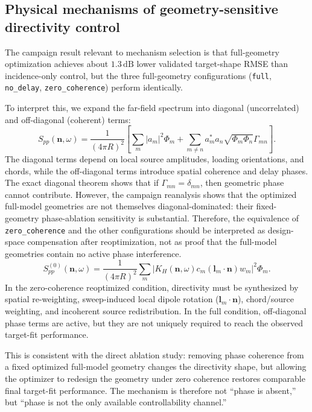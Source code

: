 \documentclass[11pt]{article}
\newcommand{\vect}[1]{\bm{#1}}
\begin{document}
\subsection{Physical mechanisms of geometry-sensitive directivity control}

The campaign result relevant to mechanism selection is that full-geometry optimization achieves about $1.3\,\mathrm{dB}$ lower validated target-shape RMSE than incidence-only control, but the three full-geometry configurations (\texttt{full}, \texttt{no\_delay}, \texttt{zero\_coherence}) perform identically.

To interpret this, we expand the far-field spectrum into diagonal (uncorrelated) and off-diagonal (coherent) terms:
\begin{equation}
    S_{pp}(\vect{n},\omega)
    =
    \frac{1}{(4\pi R)^2}
    \left[
        \sum_m |a_m|^2 \Phi_m
        +
        \sum_{m\neq n}
        a_m^* a_n
        \sqrt{\Phi_m\Phi_n}
        \Gamma_{mn}
    \right].
\end{equation}
The diagonal terms depend on local source amplitudes, loading orientations, and chords, while the off-diagonal terms introduce spatial coherence and delay phases. The exact diagonal theorem shows that if $\Gamma_{mn}=\delta_{mn}$, then geometric phase cannot contribute. However, the campaign reanalysis shows that the optimized full-model geometries are not themselves diagonal-dominated: their fixed-geometry phase-ablation sensitivity is substantial. Therefore, the equivalence of \texttt{zero\_coherence} and the other configurations should be interpreted as design-space compensation after reoptimization, not as proof that the full-model geometries contain no active phase interference.
\begin{equation}
    S_{pp}^{(0)}(\vect{n},\omega)
    =
    \frac{1}{(4\pi R)^2}
    \sum_m
    \left|
        K_H(\vect{n},\omega)
        c_m
        (\vect{l}_m\cdot\vect{n})
        w_m
    \right|^2
    \Phi_m.
\end{equation}
In the zero-coherence reoptimized condition, directivity must be synthesized by spatial re-weighting, sweep-induced local dipole rotation ($\vect{l}_m\cdot\vect{n}$), chord/source weighting, and incoherent source redistribution. In the full condition, off-diagonal phase terms are active, but they are not uniquely required to reach the observed target-fit performance.

This is consistent with the direct ablation study: removing phase coherence from a fixed optimized full-model geometry changes the directivity shape, but allowing the optimizer to redesign the geometry under zero coherence restores comparable final target-fit performance. The mechanism is therefore not ``phase is absent,'' but ``phase is not the only available controllability channel.''
\end{document}
